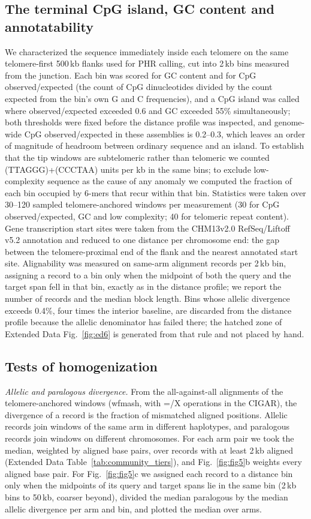 \documentclass[pdflatex,mathphys]{jnl}
\begin{document}
\subsection*{The terminal CpG island, GC content and annotatability}

We characterized the sequence immediately inside each telomere on the same telomere-first 500\,kb
flanks used for PHR calling, cut into 2\,kb bins measured from the junction. Each bin was scored for
GC content and for CpG observed/expected (the count of CpG dinucleotides divided by the count
expected from the bin's own G and C frequencies), and a CpG island was called where observed/expected
exceeded 0.6 and GC exceeded 55\% simultaneously; both thresholds were fixed before the distance
profile was inspected, and genome-wide CpG observed/expected in these assemblies is 0.2--0.3, which
leaves an order of magnitude of headroom between ordinary sequence and an island. To establish that
the tip windows are subtelomeric rather than telomeric we counted (TTAGGG)+(CCCTAA) units per kb in
the same bins; to exclude low-complexity sequence as the cause of any anomaly we computed the
fraction of each bin occupied by 6-mers that recur within that bin. Statistics were taken over
30--120 sampled telomere-anchored windows per measurement (30 for CpG observed/expected, GC and low
complexity; 40 for telomeric repeat content). Gene transcription start sites were taken from the
CHM13v2.0 RefSeq/Liftoff v5.2 annotation and reduced to one distance per chromosome end: the gap
between the telomere-proximal end of the flank and the nearest annotated start site. Alignability was
measured on same-arm alignment records per 2\,kb bin, assigning a record to a bin only when the
midpoint of both the query and the target span fell in that bin, exactly as in the distance profile;
we report the number of records and the median block length. Bins whose allelic divergence exceeds
0.4\%, four times the interior baseline, are discarded from the distance profile because the allelic
denominator has failed there; the hatched zone of Extended Data Fig.~\ref{fig:ed6} is generated from
that rule and not placed by hand.

\subsection*{Tests of homogenization}

\emph{Allelic and paralogous divergence.} From the all-against-all alignments of the telomere-anchored
windows (wfmash, with =/X operations in the CIGAR), the divergence of a record is the fraction of
mismatched aligned positions. Allelic records join windows of the same arm in different haplotypes,
and paralogous records join windows on different chromosomes. For each arm pair we took the median,
weighted by aligned base pairs, over records with at least 2\,kb aligned (Extended Data
Table~\ref{tab:community_tiers}), and Fig.~\ref{fig:fig5}b weights every aligned base pair. For
Fig.~\ref{fig:fig5}c we assigned each record to a distance bin only when the midpoints of its query and
target spans lie in the same bin (2\,kb bins to 50\,kb, coarser beyond), divided the median paralogous
by the median allelic divergence per arm and bin, and plotted the median over arms.
\end{document}
